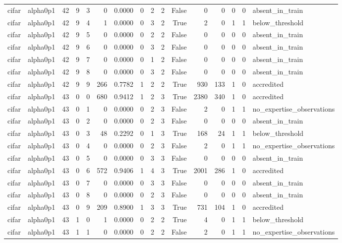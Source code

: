 \begin{tabular}{llrrrrrrrrrrrrrl}
cifar & alpha0p1 & 42 & 9 & 3 & 0 & 0.0000 & 0 & 2 & 2 & False & 0 & 0 & 0 & 0 & absent\_in\_train \\
cifar & alpha0p1 & 42 & 9 & 4 & 1 & 0.0000 & 0 & 3 & 2 & True & 2 & 0 & 1 & 1 & below\_threshold \\
cifar & alpha0p1 & 42 & 9 & 5 & 0 & 0.0000 & 0 & 2 & 2 & False & 0 & 0 & 0 & 0 & absent\_in\_train \\
cifar & alpha0p1 & 42 & 9 & 6 & 0 & 0.0000 & 0 & 3 & 2 & False & 0 & 0 & 0 & 0 & absent\_in\_train \\
cifar & alpha0p1 & 42 & 9 & 7 & 0 & 0.0000 & 0 & 1 & 2 & False & 0 & 0 & 0 & 0 & absent\_in\_train \\
cifar & alpha0p1 & 42 & 9 & 8 & 0 & 0.0000 & 0 & 3 & 2 & False & 0 & 0 & 0 & 0 & absent\_in\_train \\
cifar & alpha0p1 & 42 & 9 & 9 & 266 & 0.7782 & 1 & 2 & 2 & True & 930 & 133 & 1 & 0 & accredited \\
cifar & alpha0p1 & 43 & 0 & 0 & 680 & 0.9412 & 1 & 2 & 3 & True & 2380 & 340 & 1 & 0 & accredited \\
cifar & alpha0p1 & 43 & 0 & 1 & 0 & 0.0000 & 0 & 2 & 3 & False & 2 & 0 & 1 & 1 & no\_expertise\_observations \\
cifar & alpha0p1 & 43 & 0 & 2 & 0 & 0.0000 & 0 & 2 & 3 & False & 0 & 0 & 0 & 0 & absent\_in\_train \\
cifar & alpha0p1 & 43 & 0 & 3 & 48 & 0.2292 & 0 & 1 & 3 & True & 168 & 24 & 1 & 1 & below\_threshold \\
cifar & alpha0p1 & 43 & 0 & 4 & 0 & 0.0000 & 0 & 2 & 3 & False & 2 & 0 & 1 & 1 & no\_expertise\_observations \\
cifar & alpha0p1 & 43 & 0 & 5 & 0 & 0.0000 & 0 & 3 & 3 & False & 0 & 0 & 0 & 0 & absent\_in\_train \\
cifar & alpha0p1 & 43 & 0 & 6 & 572 & 0.9406 & 1 & 4 & 3 & True & 2001 & 286 & 1 & 0 & accredited \\
cifar & alpha0p1 & 43 & 0 & 7 & 0 & 0.0000 & 0 & 3 & 3 & False & 0 & 0 & 0 & 0 & absent\_in\_train \\
cifar & alpha0p1 & 43 & 0 & 8 & 0 & 0.0000 & 0 & 2 & 3 & False & 0 & 0 & 0 & 0 & absent\_in\_train \\
cifar & alpha0p1 & 43 & 0 & 9 & 209 & 0.8900 & 1 & 3 & 3 & True & 731 & 104 & 1 & 0 & accredited \\
cifar & alpha0p1 & 43 & 1 & 0 & 1 & 0.0000 & 0 & 2 & 2 & True & 4 & 0 & 1 & 1 & below\_threshold \\
cifar & alpha0p1 & 43 & 1 & 1 & 0 & 0.0000 & 0 & 2 & 2 & False & 2 & 0 & 1 & 1 & no\_expertise\_observations \\

\end{tabular}
